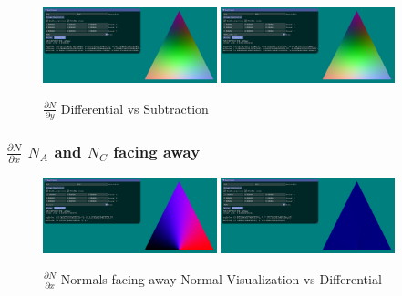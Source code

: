 \documentclass[12pt]{article}
\newcommand{\oneimgwidth}{0.45}
\newcommand{\dnndx}{\frac{\partial N}{\partial x}}
\newcommand{\dnndy}{\frac{\partial N}{\partial y}}
\begin{document}
\begin{figure}[htbp] 
	\centering
	\includegraphics[width=\oneimgwidth\textwidth]{dnn/dnndy.png}
	\includegraphics[width=\oneimgwidth\textwidth]{dnn/dnndy_sub.png}
	\caption{$\dnndy$ Differential vs Subtraction}
	\label{fig:dndx}
\end{figure}

\FloatBarrier

\subsubsection{$\dnndx$	$N_A$ and $N_C$ facing away}

\begin{figure}[htbp] 
	\centering
	\includegraphics[width=\oneimgwidth\textwidth]{dnn/normals_na_nc_facing_away.png}
	\includegraphics[width=\oneimgwidth\textwidth]{dnn/ddndx_na_nc_facing_away.png}
	\caption{$\dnndx$ Normals facing away Normal Visualization vs Differential}
	\label{fig:dndx}
\end{figure}
\end{document}
